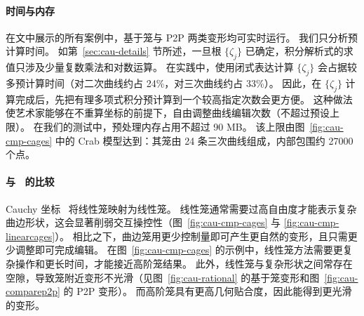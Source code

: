 \paragraph{时间与内存}
在文中展示的所有案例中，基于笼与 P2P 两类变形均可实时运行。
我们只分析预计算时间。
如第~\ref{sec:cau-details} 节所述，一旦根 \(\{\zeta_j\}\) 已确定，积分解析式的求值只涉及少量复数乘法和对数运算。
在实践中，使用闭式表达计算 \(\{\zeta_j\}\) 会占据较多预计算时间（对二次曲线约占 24\%，对三次曲线约占 33\%）。
%
因此，在 \(\{\zeta_j\}\) 计算完成后，先把有理多项式积分预计算到一个较高指定次数会更方便。
%
这种做法使艺术家能够在不重算坐标的前提下，自由调整曲线编辑次数（不超过预设上限）。
在我们的测试中，预处理内存占用不超过 90 MB。
该上限由图~\ref{fig:cau-cmp-cages} 中的 Crab 模型达到：其笼由 24 条三次曲线组成，内部包围约 27000 个点。

\paragraph{与~\cite{Weber2009} 的比较}
Cauchy 坐标~\cite{Weber2009} 将线性笼映射为线性笼。
线性笼通常需要过高自由度才能表示复杂曲边形状，这会显著削弱交互操控性（图~\ref{fig:cau-cmp-cages} 与 \ref{fig:cau-cmp-linearcages}）。
相比之下，曲边笼用更少控制量即可产生更自然的变形，且只需更少调整即可完成编辑。
%
在图~\ref{fig:cau-cmp-cages} 的示例中，线性笼方法需要更复杂操作和更长时间，才能接近高阶笼结果。
%
此外，线性笼与复杂形状之间常存在空隙，导致笼附近变形不光滑（见图~\ref{fig:cau-rational} 的基于笼变形和图~\ref{fig:cau-comparep2p} 的 P2P 变形）。
而高阶笼具有更高几何贴合度，因此能得到更光滑的变形。


